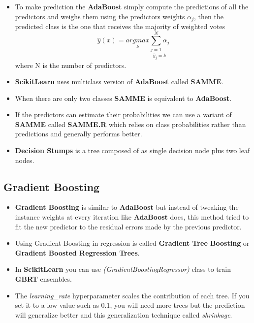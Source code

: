 \documentclass{article}
\begin{document}
\begin{itemize}
\begin{enumerate}
    	\end{enumerate}
    	\item To make prediction the \textbf{AdaBoost} simply compute the predictions of all the predictors and weighs them using the predictors weights $\alpha_{j}$, then the predicted class is the one that receives the majority of weighted votes
    	\[ \hat{y}(x) = \underset{k}{argmax} \underset{\hat{y}_{j} = k}{\sum_{j = 1}^{N} \alpha_{j}} \]
    	where N is the number of predictors.
    	\item \textbf{Scikit\textendash Learn} uses multiclass version of \textbf{AdaBoost} called \textbf{SAMME}.
    	\item When there are only two classes \textbf{SAMME} is equivalent to \textbf{AdaBoost}.
    	\item If the predictors can estimate their probabilities we can use a variant of \textbf{SAMME} called \textbf{SAMME.R} which relies on class probabilities rather than predictions and generally performs better.
    	\item \textbf{Decision Stumps} is a tree composed of as single decision node plus two leaf nodes. 
    \end{itemize}
    \subsection{Gradient Boosting}
    \begin{itemize}
    	\item \textbf{Gradient Boosting} is similar to \textbf{AdaBoost} but instead of tweaking the instance weights at every iteration like \textbf{AdaBoost} does, this method tried to fit the new predictor to the residual errors made by the previous predictor.
    	\item Using Gradient Boosting in regression is called \textbf{Gradient Tree Boosting} or \textbf{Gradient Boosted Regression Trees}.
    	\item In \textbf{Scikit\textendash Learn} you can use \textit{(GradientBoostingRegressor)} class to train \textbf{GBRT} ensembles.
    	\item The \textit{learning\_rate} hyperparameter scales the contribution of each tree. If you set it to a low value such as 0.1, you will need more trees but the prediction will generalize better and this generalization technique called \textit{shrinkage}.
    \end{itemize}
\end{document}
